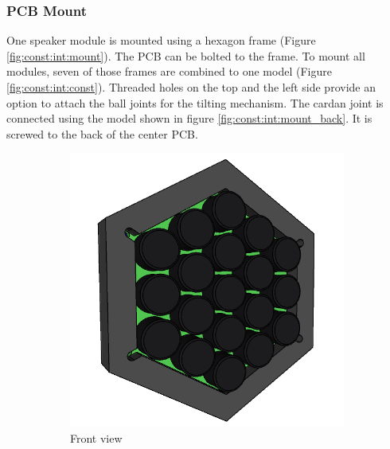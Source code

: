 \subsubsection*{PCB Mount}
%
One speaker module is mounted using a hexagon frame (Figure \ref{fig:const:int:mount}). The PCB can be bolted to the frame. To mount all modules, seven of those frames are combined to one model (Figure \ref{fig:const:int:const}). Threaded holes on the top and the left side provide an option to attach the ball joints for the tilting mechanism. The cardan joint is connected using the model shown in figure \ref{fig:const:int:mount_back}. It is screwed to the back of the center PCB.
%
\begin{figure}[ht]
  \begin{subfigure}[b]{0.49\textwidth}
    \includegraphics[width=\textwidth]{src/assets/pictures/construction/pcb_plate.png}
    \caption{Front view}
    \label{fig:const:int:mount_front}
  \end{subfigure}
  \hfill
  \begin{subfigure}[b]{0.49\textwidth}

\end{subfigure}
\end{figure}
